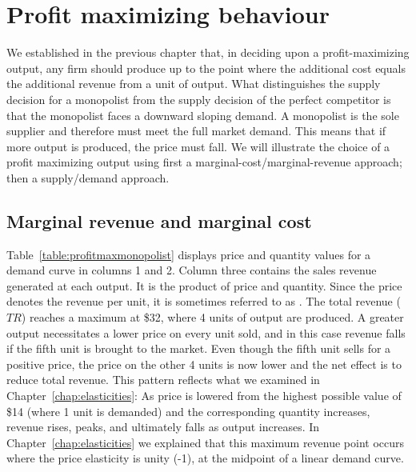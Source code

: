 \section{Profit maximizing behaviour}\label{sec:ch10sec2}

We established in the previous chapter that, in deciding upon a
profit-maximizing output, any firm should produce up to the point where the
additional cost equals the additional revenue from a unit of output. What
distinguishes the supply decision for a monopolist from the supply decision
of the perfect competitor is that the monopolist faces a downward sloping
demand. A monopolist is the sole supplier and therefore must meet the full
market demand. This means that if more output is produced, the price must
fall. We will illustrate the choice of a profit maximizing output using
first a marginal-cost/marginal-revenue approach; then a supply/demand
approach.

\subsection*{Marginal revenue and marginal cost}

Table~\ref{table:profitmaxmonopolist} displays price and quantity values for
a demand curve in columns 1 and 2. Column three contains the sales revenue
generated at each output. It is the product of price and quantity. Since the
price denotes the revenue per unit, it is sometimes referred to as %
. The total revenue ($TR$) reaches a maximum at
\$32, where 4 units of output are produced. A greater output necessitates a
lower price on every unit sold, and in this case revenue falls if the fifth
unit is brought to the market. Even though the fifth unit sells for a
positive price, the price on the other 4 units is now lower and the net
effect is to reduce total revenue. This pattern reflects what we examined in
Chapter~\ref{chap:elasticities}: As price is lowered from the highest
possible value of \$14 (where 1 unit is demanded) and the corresponding
quantity increases, revenue rises, peaks, and ultimately falls as output
increases. In Chapter~\ref{chap:elasticities} we explained that this maximum
revenue point occurs where the price elasticity is unity (-1), at the
midpoint of a linear demand curve.

